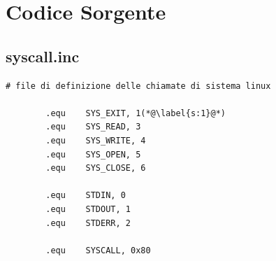 \documentclass[a4paper,11pt]{article}
\begin{document}
	
		\section{Codice Sorgente}
		
		\subsection{syscall.inc}
		
		\begin{lstlisting}[language=MyAssembler, style=MyAsm]
		# file di definizione delle chiamate di sistema linux
			
		.equ    SYS_EXIT, 1(*@\label{s:1}@*)
		.equ    SYS_READ, 3
		.equ    SYS_WRITE, 4
		.equ    SYS_OPEN, 5
		.equ    SYS_CLOSE, 6
			
		.equ    STDIN, 0
		.equ    STDOUT, 1
		.equ    STDERR, 2
			
		.equ    SYSCALL, 0x80
		\end{lstlisting}
\end{document}
